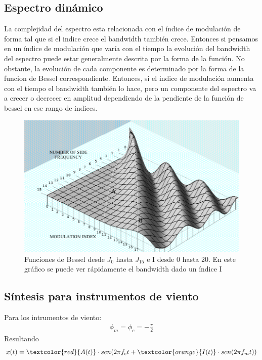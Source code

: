 \documentclass[assd_tp2_main.tex]{subfiles}
\begin{document}
\subsection{Espectro dinámico}
La complejidad del espectro esta relacionada con el índice de modulación de forma tal que si el indice crece el bandwidth también crece. Entonces si pensamos en un índice de modulación que varía con el tiempo la evolución del bandwidth del espectro puede estar generalmente descrita por la forma de la función.
No obstante, la evolución de cada componente es determinado por la forma de la funcion de Bessel correspondiente.
Entonces, si el indice de modulación aumenta con el tiempo el bandwidth también lo hace, pero un componente del espectro va a crecer o decrecer en amplitud dependiendo de la pendiente de la función de bessel en ese rango de indices.

\begin{figure}[H]
\centering
\includegraphics[width=0.8\linewidth]{graficos/EJ4/EspectroDinamico.png}
\caption{Funciones de Bessel desde $J_0$ hasta $J_{15}$ e I desde 0 hasta 20. En este gráfico se puede ver rápidamente el bandwidth dado un índice I}
\label{fig:DynamicSpectrum}
\end{figure}



\subsection{Síntesis para instrumentos de viento}
Para los intrumentos de viento:
\begin{eqnarray*}
\displaystyle \phi_m=\phi_c=-\frac{\pi}{2}
\end{eqnarray*}
Resultando
\begin{eqnarray*}
\textstyle x(t)=\textcolor{red}{A(t)}\cdot sen(2\pi f_c t+\textcolor{orange}{I(t)}\cdot sen(2\pi f_mt))
\end{eqnarray*}
\end{document}
